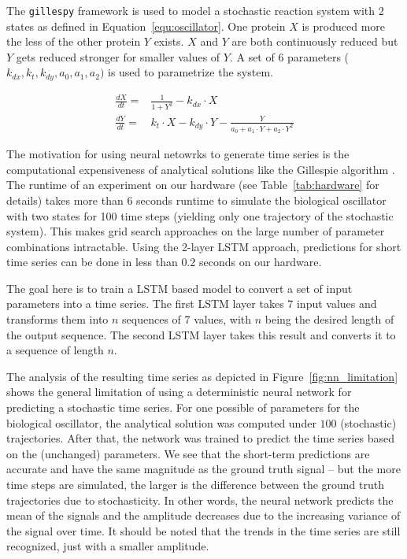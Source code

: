 \documentclass{article}
\begin{document}
The \texttt{gillespy} framework is used to 
model a stochastic reaction system with 2 states as defined 
in Equation~\ref{equ:oscillator}.
One protein $X$ is produced more the less of the other protein $Y$
exists. $X$ and $Y$ are both continuously reduced but $Y$ gets reduced stronger
for smaller values of $Y$. A set of 6 parameters
($k_{dx}, k_t, k_{dy}, a_0, a_1, a_2)$
is used to parametrize the system.

\begin{align}
    \frac{dX}{dt} = & \frac{1}{1+Y^2} - k_{dx} \cdot X                                           \\
    \frac{dY}{dt} = & k_t \cdot X - k_{dy} \cdot Y - \frac{Y}{a_0 + a_1 \cdot Y + a_2 \cdot Y^2}
    \label{equ:oscillator}
\end{align}

The motivation for using neural netowrks to generate time series is the
computational expensiveness of analytical solutions like the Gillespie
algorithm \cite{gillespie1977}. The runtime of an experiment on our hardware
(see Table~\ref{tab:hardware} for details)
takes more than 6 seconds runtime to simulate the biological oscillator with two
states for 100 time steps (yielding only one trajectory of the stochastic
system). This makes grid search approaches on the large number
of parameter
combinations intractable. Using the 2-layer LSTM approach, predictions for
short time series can be done in less than $0.2$ seconds on our hardware.

The goal here is to train a LSTM based
model to convert a set of input parameters into a time series. The first
LSTM layer
takes 7 input values and transforms them into $n$ sequences of 7 values, with
$n$ being the desired length of the output sequence. The second LSTM layer
takes this result and converts it to a sequence of length $n$.

The analysis of the resulting time series as depicted in
Figure~\ref{fig:nn_limitation} shows the general limitation of using a
deterministic neural network for predicting a stochastic time series. For one
possible of parameters for the biological oscillator, the analytical solution
was computed under $100$ (stochastic) trajectories. After that, the network was
trained to predict the time series based on the (unchanged) parameters. We see
that the short-term predictions are accurate and have the same magnitude as the
ground truth signal -- but the more time steps are simulated, the larger is the
difference between the ground truth trajectories due to stochasticity. In other
words, the neural network predicts the mean of the signals and the amplitude
decreases due to the increasing variance of the signal over time.
It should be noted that the trends in the time series are still
recognized, just with a smaller amplitude.
\end{document}
